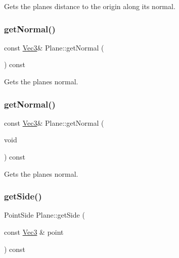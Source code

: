 Gets the plane\textquotesingle{}s distance to the origin along its normal. \mbox{\label{classPlane_af13c988be52f6382261ecd70987a24df}} 
\subsubsection{\texorpdfstring{get\+Normal()}{getNormal()}\hspace{0.1cm}{\footnotesize\ttfamily [1/2]}}
{\footnotesize\ttfamily const \hyperlink{classVec3}{Vec3}\& Plane\+::get\+Normal (\begin{DoxyParamCaption}{ }\end{DoxyParamCaption}) const\hspace{0.3cm}{\ttfamily [inline]}}

Gets the plane\textquotesingle{}s normal. \mbox{\label{classPlane_af13c988be52f6382261ecd70987a24df}} 
\subsubsection{\texorpdfstring{get\+Normal()}{getNormal()}\hspace{0.1cm}{\footnotesize\ttfamily [2/2]}}
{\footnotesize\ttfamily const \hyperlink{classVec3}{Vec3}\& Plane\+::get\+Normal (\begin{DoxyParamCaption}\item[{void}]{ }\end{DoxyParamCaption}) const\hspace{0.3cm}{\ttfamily [inline]}}

Gets the plane\textquotesingle{}s normal. \mbox{\label{classPlane_ac28f2e1e492b6267819ad3ad38d96c5a}} 
\subsubsection{\texorpdfstring{get\+Side()}{getSide()}\hspace{0.1cm}{\footnotesize\ttfamily [1/2]}}
{\footnotesize\ttfamily Point\+Side Plane\+::get\+Side (\begin{DoxyParamCaption}\item[{const \hyperlink{classVec3}{Vec3} \&}]{point }\end{DoxyParamCaption}) const}

